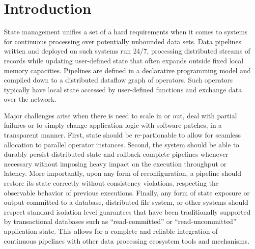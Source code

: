 
\section{Introduction}
\label{sec:intro}

State management unifies a set of a hard requirements when it comes to systems for continuous processing over potentially unbounded data sets. Data pipelines written and deployed on such systems run 24/7, processing distributed streams of records while updating user-defined state that often expands outside fixed local memory capacities. Pipelines are defined in a declarative programming model and compiled down to a distributed dataflow graph of operators. Such operators typically have local state accessed by user-defined functions and exchange data over the network.

Major challenges arise when there is need to scale in or out, deal with partial failures or to simply change application logic with software patches, in a transparent manner. First, state should be  re-partionable to allow for seamless allocation to parallel operator instances. Second, the system should be able to durably persist distributed state and rollback complete pipelines whenever necessary without imposing heavy impact on the execution throughput or latency. More importantly, upon any form of reconfiguration, a pipeline should restore its state correctly without consistency violations, respecting the observable behavior of previous executions. Finally, any form of state exposure or output committed to a database, distributed file system, or other systems should respect standard isolation level guarantees that have been traditionally supported by transactional databases such as ``read-committed'' or ``read-uncommitted'' application state. This allows for a complete and reliable integration of continuous pipelines with other data processing ecosystem tools and mechanisms.


